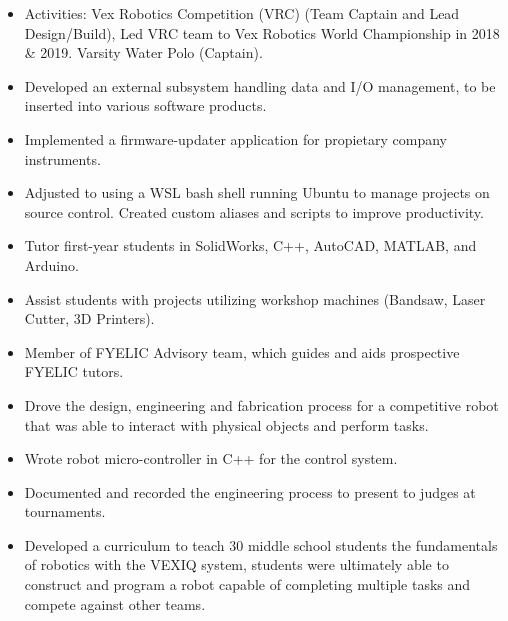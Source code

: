 \documentclass[10pt,a4paper,ragged2e,withhyper]{altacv}
\begin{document}
\begin{paracol}{2}
    \begin{itemize}
        \item Activities: Vex Robotics Competition (VRC) (Team Captain and Lead Design/Build), Led VRC team to Vex Robotics World Championship in 2018 \& 2019. Varsity Water Polo (Captain).
    \end{itemize}
    \vspace{-1.5em} %
    \begin{itemize}
        \item Developed an external subsystem handling data and I/O management, to be inserted into various software products.
        \item Implemented a firmware-updater application for propietary company instruments.
        \item Adjusted to using a WSL bash shell running Ubuntu to manage projects on source control. Created custom aliases and scripts to improve productivity.
    \end{itemize}

    \begin{itemize}
        \item Tutor first-year students in SolidWorks, C++, AutoCAD, MATLAB, and Arduino.
        \item Assist students with projects utilizing workshop machines (Bandsaw, Laser Cutter, 3D Printers).
        \item Member of FYELIC Advisory team, which guides and aids prospective FYELIC tutors.
    \end{itemize}

    \begin{itemize}
        \item Drove the design, engineering and fabrication process for a competitive robot that was able to interact with physical objects and perform tasks.
        \item Wrote robot micro-controller in C++ for the control system.
        \item Documented and recorded the engineering process to present to judges at tournaments.
        \item Developed a curriculum to teach 30 middle school students the fundamentals of robotics with the VEXIQ system, students were ultimately able to construct and program a robot capable of completing multiple tasks and compete against other teams.
    \end{itemize}


\end{paracol}
\end{document}
